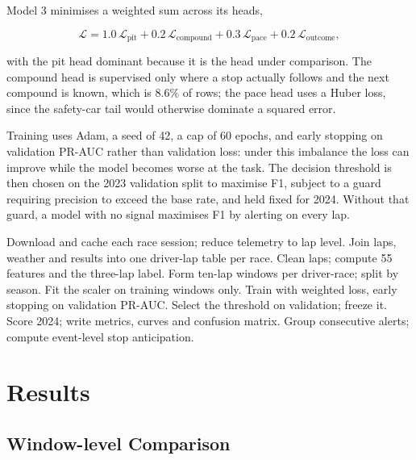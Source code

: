 \documentclass[conference]{IEEEtran}
\begin{document}
Model 3 minimises a weighted sum across its heads,

\begin{equation}
\mathcal{L}=1.0\,\mathcal{L}_{\mathrm{pit}}
+0.2\,\mathcal{L}_{\mathrm{compound}}
+0.3\,\mathcal{L}_{\mathrm{pace}}
+0.2\,\mathcal{L}_{\mathrm{outcome}},
\end{equation}

with the pit head dominant because it is the head under comparison. The compound head is supervised only where a stop actually follows and the next compound is known, which is 8.6\% of rows; the pace head uses a Huber loss, since the safety-car tail would otherwise dominate a squared error.

Training uses Adam, a seed of 42, a cap of 60 epochs, and early stopping on validation PR-AUC rather than validation loss: under this imbalance the loss can improve while the model becomes worse at the task. The decision threshold is then chosen on the 2023 validation split to maximise F1, subject to a guard requiring precision to exceed the base rate, and held fixed for 2024. Without that guard, a model with no signal maximises F1 by alerting on every lap.

\begin{algorithm}[t]
\caption{Pipeline}
\label{alg:workflow}
\begin{algorithmic}[1]
\STATE Download and cache each race session; reduce telemetry to lap level.
\STATE Join laps, weather and results into one driver-lap table per race.
\STATE Clean laps; compute 55 features and the three-lap label.
\STATE Form ten-lap windows per driver-race; split by season.
\STATE Fit the scaler on training windows only.
  \STATE Train with weighted loss, early stopping on validation PR-AUC.
  \STATE Select the threshold on validation; freeze it.
  \STATE Score 2024; write metrics, curves and confusion matrix.
\ENDFOR
\STATE Group consecutive alerts; compute event-level stop anticipation.
\end{algorithmic}
\end{algorithm}

\section{Results}

\subsection{Window-level Comparison}
\end{document}
